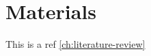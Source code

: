 \chapter{Materials}\label{ch:materials}

This is a ref \cite{yeniscavich_correlation_1970} \ref{ch:literature-review}